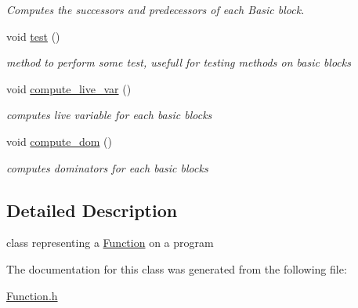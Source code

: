 \begin{DoxyCompactItemize}
\begin{DoxyCompactList}\small\item\em Computes the successors and predecessors of each Basic block. \end{DoxyCompactList}\item 
\hypertarget{class_function_aaa0d06640a5075c416106a88bd9a833a}{}void \hyperlink{class_function_aaa0d06640a5075c416106a88bd9a833a}{test} ()\label{class_function_aaa0d06640a5075c416106a88bd9a833a}

\begin{DoxyCompactList}\small\item\em method to perform some test, usefull for testing methods on basic blocks \end{DoxyCompactList}\item 
\hypertarget{class_function_a21b614fb69692ba00240831c8fe8beb9}{}void \hyperlink{class_function_a21b614fb69692ba00240831c8fe8beb9}{compute\+\_\+live\+\_\+var} ()\label{class_function_a21b614fb69692ba00240831c8fe8beb9}

\begin{DoxyCompactList}\small\item\em computes live variable for each basic blocks \end{DoxyCompactList}\item 
\hypertarget{class_function_a9ecf8e774164937c3dfdb989ebe1c866}{}void \hyperlink{class_function_a9ecf8e774164937c3dfdb989ebe1c866}{compute\+\_\+dom} ()\label{class_function_a9ecf8e774164937c3dfdb989ebe1c866}

\begin{DoxyCompactList}\small\item\em computes dominators for each basic blocks \end{DoxyCompactList}\end{DoxyCompactItemize}


\subsection{Detailed Description}
class representing a \hyperlink{class_function}{Function} on a program 

The documentation for this class was generated from the following file\+:\begin{DoxyCompactItemize}
\item 
\hyperlink{_function_8h}{Function.\+h}\end{DoxyCompactItemize}
